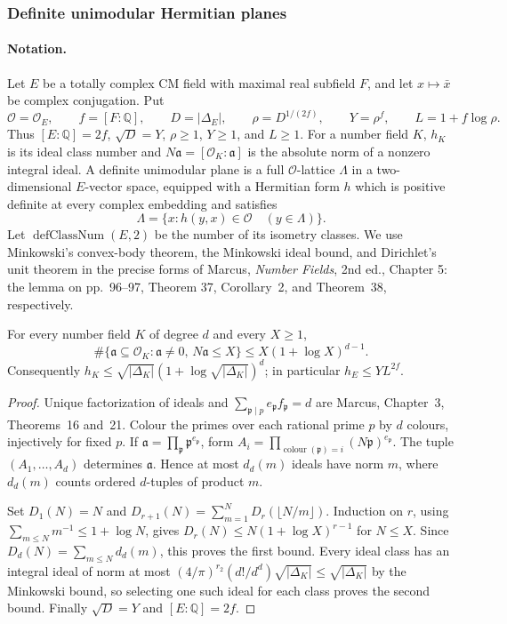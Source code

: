 \subsubsection{Definite unimodular Hermitian planes}\label{sec:rank-two-planes}

\paragraph{Notation.} Let $E$ be a totally complex CM field with maximal real
subfield $F$, and let $x\mapsto\bar x$ be complex conjugation. Put
\[
\mathcal O=\mathcal O_E,\qquad f=[F:\mathbb Q],\qquad D=|\Delta_E|,
\qquad \rho=D^{1/(2f)},\qquad Y=\rho^f,\qquad L=1+f\log\rho .
\]
Thus $[E:\mathbb Q]=2f$, $\sqrt D=Y$, $\rho\geq1$, $Y\geq1$, and $L\geq1$.
For a number field $K$, $h_K$ is its ideal class number and
$N\mathfrak a=[\mathcal O_K:\mathfrak a]$ is the absolute norm of a nonzero
integral ideal. A definite unimodular plane is a full $\mathcal O$-lattice
$\Lambda$ in a two-dimensional $E$-vector space, equipped with a Hermitian
form $h$ which is positive definite at every complex embedding and satisfies
\[
\Lambda=\{x:h(y,x)\in\mathcal O\quad(y\in\Lambda)\}.
\]
Let $\operatorname{defClassNum}(E,2)$ be the number of its isometry classes.
We use Minkowski's convex-body theorem, the Minkowski ideal bound, and
Dirichlet's unit theorem in the precise forms of Marcus, \emph{Number Fields},
2nd ed., Chapter 5: the lemma on pp.~96--97, Theorem 37, Corollary~2, and
Theorem~38, respectively.

\begin{lemma}\label{lem:hyperbola-ideals}
For every number field $K$ of degree $d$ and every $X\geq1$,
\[
\#\{\mathfrak a\subseteq\mathcal O_K:\mathfrak a\neq0,\,
N\mathfrak a\leq X\}\leq X(1+\log X)^{d-1}.
\]
Consequently $h_K\leq\sqrt{|\Delta_K|}(1+\log\sqrt{|\Delta_K|})^d$; in
particular $h_E\leq YL^{2f}$.
\end{lemma}
\begin{proof}
Unique factorization of ideals and $\sum_{\mathfrak p\mid p}e_{\mathfrak p}
f_{\mathfrak p}=d$ are Marcus, Chapter~3, Theorems~16 and~21. Colour the primes
over each rational prime $p$ by $d$ colours, injectively for fixed $p$. If
$\mathfrak a=\prod_{\mathfrak p}\mathfrak p^{e_{\mathfrak p}}$, form
$A_i=\prod_{\operatorname{colour}(\mathfrak p)=i}(N\mathfrak p)^{e_{\mathfrak p}}$.
The tuple $(A_1,\ldots,A_d)$ determines $\mathfrak a$. Hence at most $d_d(m)$
ideals have norm $m$, where $d_d(m)$ counts ordered $d$-tuples of product $m$.

Set $D_1(N)=N$ and
$D_{r+1}(N)=\sum_{m=1}^{N}D_r(\lfloor N/m\rfloor)$. Induction on $r$, using
$\sum_{m\leq N}m^{-1}\leq1+\log N$, gives
$D_r(N)\leq N(1+\log X)^{r-1}$ for $N\leq X$. Since
$D_d(N)=\sum_{m\leq N}d_d(m)$, this proves the first bound. Every ideal class
has an integral ideal of norm at most
$(4/\pi)^{r_2}(d!/d^d)\sqrt{|\Delta_K|}\leq\sqrt{|\Delta_K|}$ by the
Minkowski bound, so selecting one such ideal for each class proves the second
bound. Finally $\sqrt D=Y$ and $[E:\mathbb Q]=2f$.
\end{proof}

